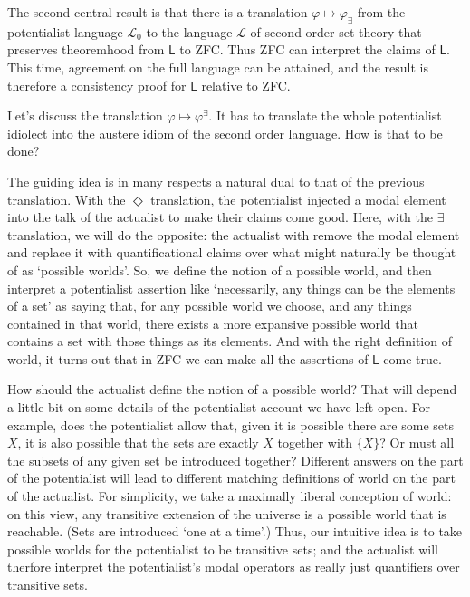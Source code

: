 \documentclass{article}
\begin{document}
The second central result is that there is a translation $\varphi \mapsto \varphi_\exists$ from the 
potentialist language $\mathcal{L}_0$ to the language $\mathcal{L}$ of second order 
set theory that preserves theoremhood from $\mathsf{L}$ to ZFC. Thus ZFC can 
interpret the claims of $\mathsf{L}$. This time, agreement on the full language can be 
attained, and the result is therefore a consistency proof for $\mathsf{L}$ relative to ZFC.


Let's discuss the translation $\varphi \mapsto \varphi^\exists$.
It has to translate the whole potentialist idiolect into the austere idiom of the 
second order language. How is that to be done? 

The guiding idea is in many respects a natural dual to that of the previous translation.
With the $\Diamond$ translation, the potentialist injected a modal element into 
the talk of the actualist to make their claims come good. Here, with the $\exists$ translation,
we will do the opposite: the actualist with remove the modal element and replace it 
with quantificational claims over what might naturally be thought of as `possible worlds'.
So, we define the notion of a possible world, and then interpret a potentialist assertion 
like `necessarily, any things can be the elements of a set' as saying that, for any possible world 
we choose, and any things contained in that world, there exists a more expansive possible 
world that contains a set with those things as its elements. And with the right 
definition of world, it turns out that in ZFC we can make all the assertions of 
$\mathsf{L}$ come true. 

How should the actualist define the notion of a possible world? That will depend a 
little bit on some details of the potentialist account we have left open. For example, 
does the potentialist allow that, given it is possible there are some sets $X$, it is also 
possible that the sets are exactly $X$ together with $\{X\}$? Or must 
all the subsets of any given set be introduced together? Different answers on the 
part of the potentialist will lead to different matching definitions of world on 
the part of the actualist. For simplicity, we take a maximally liberal conception of 
world: on this view, any transitive extension of the universe is a possible world 
that is reachable. (Sets are introduced `one at a time'.) Thus, our intuitive idea 
is to take possible worlds for the potentialist to be transitive sets; and 
the actualist will therfore interpret the potentialist's modal operators 
as really just quantifiers over transitive sets.
\end{document}
